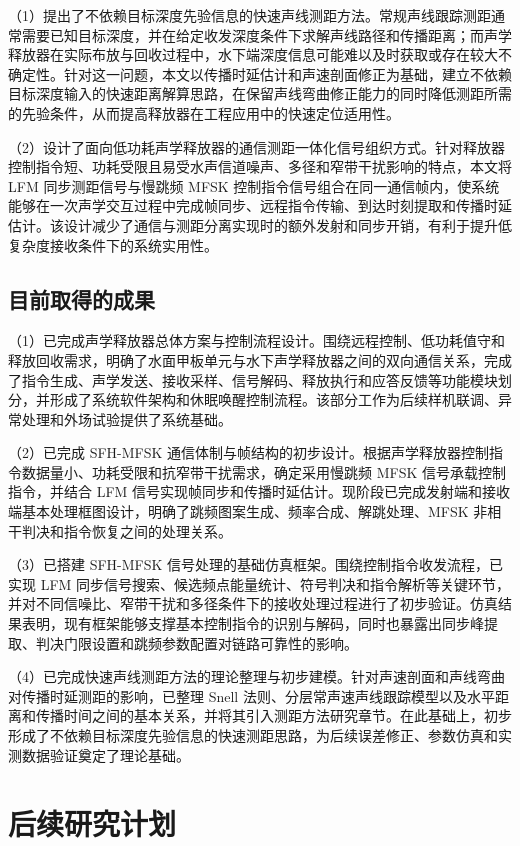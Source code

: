 （1）提出了不依赖目标深度先验信息的快速声线测距方法。常规声线跟踪测距通常需要已知目标深度，并在给定收发深度条件下求解声线路径和传播距离；而声学释放器在实际布放与回收过程中，水下端深度信息可能难以及时获取或存在较大不确定性。针对这一问题，本文以传播时延估计和声速剖面修正为基础，建立不依赖目标深度输入的快速距离解算思路，在保留声线弯曲修正能力的同时降低测距所需的先验条件，从而提高释放器在工程应用中的快速定位适用性。

（2）设计了面向低功耗声学释放器的通信测距一体化信号组织方式。针对释放器控制指令短、功耗受限且易受水声信道噪声、多径和窄带干扰影响的特点，本文将 LFM 同步测距信号与慢跳频 MFSK 控制指令信号组合在同一通信帧内，使系统能够在一次声学交互过程中完成帧同步、远程指令传输、到达时刻提取和传播时延估计。该设计减少了通信与测距分离实现时的额外发射和同步开销，有利于提升低复杂度接收条件下的系统实用性。

\subsection{目前取得的成果}

（1）已完成声学释放器总体方案与控制流程设计。围绕远程控制、低功耗值守和释放回收需求，明确了水面甲板单元与水下声学释放器之间的双向通信关系，完成了指令生成、声学发送、接收采样、信号解码、释放执行和应答反馈等功能模块划分，并形成了系统软件架构和休眠唤醒控制流程。该部分工作为后续样机联调、异常处理和外场试验提供了系统基础。

（2）已完成 SFH-MFSK 通信体制与帧结构的初步设计。根据声学释放器控制指令数据量小、功耗受限和抗窄带干扰需求，确定采用慢跳频 MFSK 信号承载控制指令，并结合 LFM 信号实现帧同步和传播时延估计。现阶段已完成发射端和接收端基本处理框图设计，明确了跳频图案生成、频率合成、解跳处理、MFSK 非相干判决和指令恢复之间的处理关系。

（3）已搭建 SFH-MFSK 信号处理的基础仿真框架。围绕控制指令收发流程，已实现 LFM 同步信号搜索、候选频点能量统计、符号判决和指令解析等关键环节，并对不同信噪比、窄带干扰和多径条件下的接收处理过程进行了初步验证。仿真结果表明，现有框架能够支撑基本控制指令的识别与解码，同时也暴露出同步峰提取、判决门限设置和跳频参数配置对链路可靠性的影响。

（4）已完成快速声线测距方法的理论整理与初步建模。针对声速剖面和声线弯曲对传播时延测距的影响，已整理 Snell 法则、分层常声速声线跟踪模型以及水平距离和传播时间之间的基本关系，并将其引入测距方法研究章节。在此基础上，初步形成了不依赖目标深度先验信息的快速测距思路，为后续误差修正、参数仿真和实测数据验证奠定了理论基础。

\section{后续研究计划}

